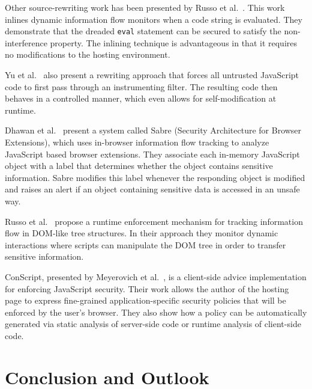 \documentclass{llncs}
\begin{document}
Other source-rewriting work has been presented by Russo et al.~\cite{onthefly}.
This work inlines dynamic information flow monitors when a code string is evaluated.
They demonstrate that the dreaded \texttt{eval} statement can be secured to satisfy the non-interference property.
The inlining technique is advantageous in that it requires no modifications to the hosting environment.

Yu et al.~\cite{1190252} also present a rewriting approach that forces all untrusted JavaScript code to first pass through an instrumenting filter.
The resulting code then behaves in a controlled manner, which even allows for self-modification at runtime.

Dhawan et al.~\cite{1723250} present a system called Sabre (Security Architecture for Browser Extensions), which uses in-browser information flow tracking to analyze JavaScript based browser extensions.
They associate each in-memory JavaScript object with a label that determines whether the object contains sensitive information.
Sabre modifies this label whenever the responding object is modified and raises an alert if an object containing sensitive data is accessed in an unsafe way.

Russo et al.~\cite{1813092} propose a runtime enforcement mechanism for tracking information flow in DOM-like tree structures.
In their approach they monitor dynamic interactions where scripts can manipulate the DOM tree in order to transfer sensitive information.

ConScript, presented by Meyerovich et al.~\cite{5504806}, is a client-side advice implementation for enforcing JavaScript security.
Their work allows the author of the hosting page to express fine-grained application-specific security policies that will be enforced by the user's browser.
They also show how a policy can be automatically generated via static analysis of server-side code or runtime analysis of client-side code.



\section{Conclusion and Outlook}
\label{sec:conclusion}
\end{document}

